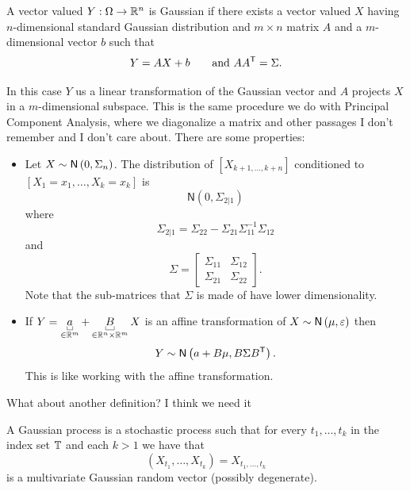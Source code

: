 \documentclass[12pt]{report}
\begin{document}
\begin{definition}
	A vector valued \rv{} $Y:\Omega\to\mathbb{R}^{n}$ is Gaussian if there exists a vector valued $X$ having $n$-dimensional standard Gaussian distribution and $m\times n$ matrix $A$ and a $m$-dimensional vector $b$ such that
	\begin{equation*}
		Y=AX+b\qquad\text{and }AA^{\mathsf{T}}=\Sigma.
	\end{equation*}
\end{definition}
In this case $Y$ us a linear transformation of the Gaussian vector and $A$ projects $X$ in a $m$-dimensional subspace. This is the same procedure we do with Principal Component Analysis, where we diagonalize a matrix and other passages I don't remember and I don't care about.
There are some properties:
\begin{proposition}
	\begin{itemize}
		\item Let $X\sim\mathsf{N}\left(0,\Sigma_{n}\right)$. The distribution of $\left[X_{k+1,\ldots,k+n}\right]$ conditioned to $\left[X_{1}=x_{1},\ldots,X_{k}=x_{k}\right]$ is \begin{equation*}
		\mathsf{N}(0,\Sigma_{2|1})
		\end{equation*}
		where 
		\begin{equation*}
			\Sigma_{2|1}=\Sigma_{22}-\Sigma_{21}\Sigma_{11}^{-1}\Sigma_{12}
		\end{equation*}
		and 
		\begin{equation*}
			\Sigma=\begin{bmatrix}
				\Sigma_{11}&\Sigma_{12}\\
				\Sigma_{21}&\Sigma_{22}
			\end{bmatrix}.
		\end{equation*}
		Note that the sub-matrices that $\Sigma$ is made of have lower dimensionality.
		\item If $Y=\ubracketthin{a}_{\in\R^{m}}+\ubracketthin{B}_{\in\R^{n}\times\R^{m}}X$ is an affine transformation of $X\sim\mathsf{N}\left(\mu,\varepsilon\right)$ then $$Y\sim\mathsf{N}\left(a+B\mu, B\Sigma B^{\mathsf{T}}\right).$$
		This is like working with the affine transformation.
	\end{itemize}
\end{proposition}
What about another definition? I think we need it
\begin{definition}
	A Gaussian process is a stochastic process such that for every $t_{1},\ldots,t_{k}$ in the index set $\mathbb{T}$ and each $k>1$ we have that
	\begin{equation*}
		\left(X_{t_{1}},\ldots,X_{t_{k}}\right)=X_{t_{1},\ldots,t_{k}}
	\end{equation*}
	is a multivariate Gaussian random vector (possibly degenerate).
\end{definition}
\end{document}
